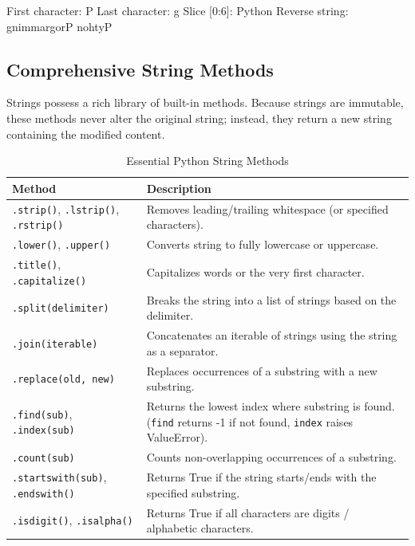 \begin{outputbox}
First character: P
Last character: g
Slice [0:6]: Python
Reverse string: gnimmargorP nohtyP
\end{outputbox}

\subsection{Comprehensive String Methods} \label{sec:string_methods}

Strings possess a rich library of built-in methods. Because strings are immutable, these methods never alter the original string; instead, they return a new string containing the modified content. 

\begin{table}[H]
    \centering\sffamily
    
    \begin{tabular}{p{4.5cm} p{10cm}}
    \toprule
    \textbf{Method} & \textbf{Description} \\
    \midrule
    \texttt{.strip()}, \texttt{.lstrip()}, \texttt{.rstrip()} & Removes leading/trailing whitespace (or specified characters). \\
    \texttt{.lower()}, \texttt{.upper()} & Converts string to fully lowercase or uppercase. \\
    \texttt{.title()}, \texttt{.capitalize()} & Capitalizes words or the very first character. \\
    \texttt{.split(delimiter)} & Breaks the string into a list of strings based on the delimiter. \\
    \texttt{.join(iterable)} & Concatenates an iterable of strings using the string as a separator. \\
    \texttt{.replace(old, new)} & Replaces occurrences of a substring with a new substring. \\
    \texttt{.find(sub)}, \texttt{.index(sub)} & Returns the lowest index where substring is found. (\texttt{find} returns -1 if not found, \texttt{index} raises ValueError). \\
    \texttt{.count(sub)} & Counts non-overlapping occurrences of a substring. \\
    \texttt{.startswith(sub)}, \texttt{.endswith()} & Returns True if the string starts/ends with the specified substring. \\
    \texttt{.isdigit()}, \texttt{.isalpha()} & Returns True if all characters are digits / alphabetic characters. \\
    \bottomrule
    \end{tabular}
    \caption{Essential Python String Methods}
\end{table}

